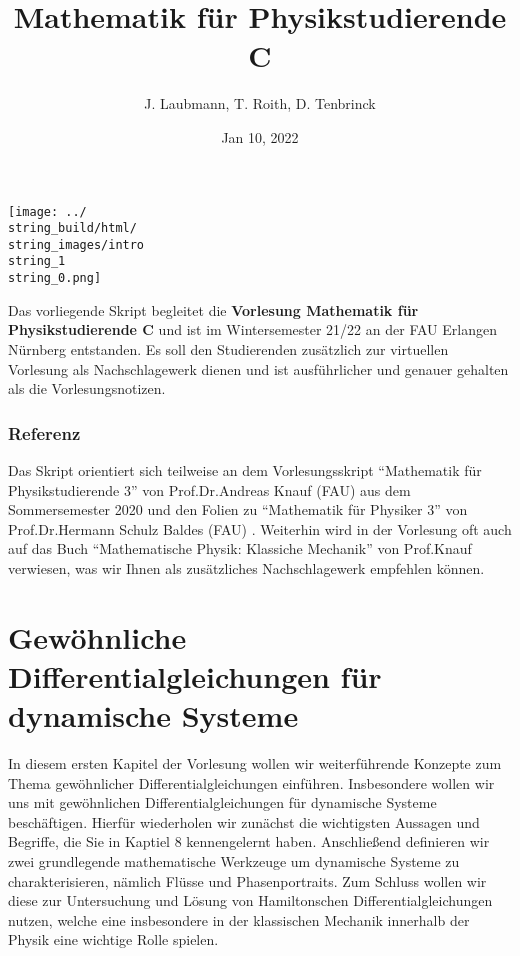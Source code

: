\documentclass[letterpaper,10pt,english]{jupyterBook}
\title{Mathematik für Physikstudierende C}
\date{Jan 10, 2022}
\author{J.\@{} Laubmann, T.\@{} Roith, D.\@{} Tenbrinck}
\begin{document}
\label{\detokenize{intro::doc}}


\noindent\texttt{[image: ../\\string\_build/html/\\string\_images/intro\\string\_1\\string\_0.png]}

\par
Das vorliegende Skript begleitet die \textbf{Vorlesung Mathematik für Physikstudierende C} und ist im Wintersemester 21/22 an der FAU Erlangen Nürnberg entstanden. Es soll den Studierenden zusätzlich zur virtuellen Vorlesung als Nachschlagewerk dienen und ist ausführlicher und genauer gehalten als die Vorlesungsnotizen.

\subsection{Referenz}

\par
Das Skript orientiert sich teilweise an dem Vorlesungsskript “Mathematik für Physikstudierende 3” \cite{Kna20} von Prof.Dr.Andreas Knauf (FAU) aus dem Sommersemester 2020 und den Folien zu “Mathematik für Physiker 3” von Prof.Dr.Hermann Schulz Baldes (FAU) \cite{SB18}. Weiterhin wird in der Vorlesung oft auch auf das Buch “Mathematische Physik: Klassiche Mechanik” \cite{Kna17} von Prof.Knauf verwiesen, was wir Ihnen als zusätzliches Nachschlagewerk empfehlen können.


\chapter{Gewöhnliche Differentialgleichungen für dynamische Systeme}
\label{\detokenize{ode/ode:gewohnliche-differentialgleichungen-fur-dynamische-systeme}}\label{\detokenize{ode/ode::doc}}
\par
In diesem ersten Kapitel der Vorlesung wollen wir weiterführende Konzepte zum Thema gewöhnlicher Differentialgleichungen einführen.
Insbesondere wollen wir uns mit gewöhnlichen Differentialgleichungen für dynamische Systeme beschäftigen.
Hierfür wiederholen wir zunächst die wichtigsten Aussagen und Begriffe, die Sie in Kaptiel 8 \cite{Ten21} kennengelernt haben.
Anschließend definieren wir zwei grundlegende mathematische Werkzeuge um dynamische Systeme zu charakterisieren, nämlich Flüsse und Phasenportraits.
Zum Schluss wollen wir diese zur Untersuchung und Lösung von Hamiltonschen Differentialgleichungen nutzen, welche eine insbesondere in der klassischen Mechanik innerhalb der Physik eine wichtige Rolle spielen.
\end{document}
